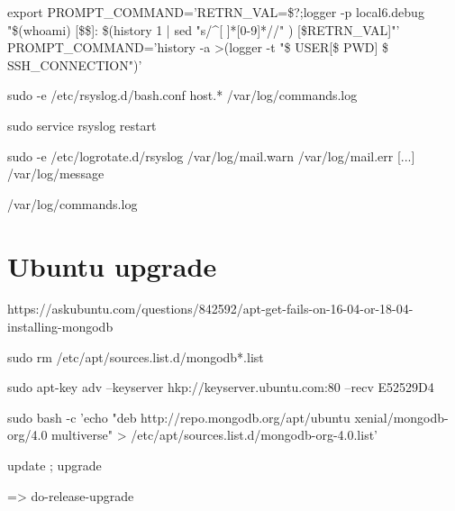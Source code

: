 export PROMPT_COMMAND='RETRN_VAL=\$?;logger -p local6.debug "\$(whoami) [\$\$]: \$(history 1 | sed "s/^[ ]*[0-9]\+[ ]*//" ) [\$RETRN_VAL]"'
PROMPT_COMMAND='history -a >(logger -t "\$ USER[\$ PWD] \$ SSH_CONNECTION")'

sudo -e /etc/rsyslog.d/bash.conf
   host.*    /var/log/commands.log

sudo service rsyslog restart

sudo -e /etc/logrotate.d/rsyslog
/var/log/mail.warn
/var/log/mail.err
[...]
/var/log/message

/var/log/commands.log



\section*{Ubuntu upgrade}

https://askubuntu.com/questions/842592/apt-get-fails-on-16-04-or-18-04-installing-mongodb

sudo rm /etc/apt/sources.list.d/mongodb*.list

sudo apt-key adv --keyserver hkp://keyserver.ubuntu.com:80 --recv E52529D4

sudo bash -c 'echo "deb http://repo.mongodb.org/apt/ubuntu xenial/mongodb-org/4.0 multiverse" > /etc/apt/sources.list.d/mongodb-org-4.0.list'

update ; upgrade 

=> do-release-upgrade












